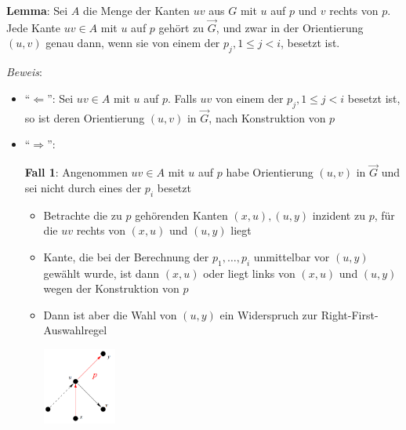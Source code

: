 \textbf{Lemma}: Sei $A$ die Menge der Kanten $uv$ aus $G$ mit $u$ auf $p$ und $v$ rechts von $p$.
Jede Kante $uv\in A$ mit $u$ auf $p$ gehört zu $\overrightarrow{G}$, und zwar in der Orientierung $(u,v)$
genau dann, wenn sie von einem der $p_j, 1\leq j<i$, besetzt ist.

\textit{Beweis}: 
\begin{itemize}
	\item \enquote{$\Leftarrow$}: Sei $uv\in A$ mit $u$ auf $p$. Falls $uv$ von einem der $p_j, 1\leq j<i$ besetzt ist, so ist deren Orientierung $(u,v)$ in $\overrightarrow{G}$, nach Konstruktion von $p$
	\item \enquote{$\Rightarrow$}: 
	
	\textbf{Fall 1}: Angenommen $uv\in A$ mit $u$ auf $p$ habe Orientierung $(u,v)$ in $\overrightarrow{G}$ und sei nicht durch eines der $p_i$ besetzt
	\begin{itemize}
		\item Betrachte die zu $p$ gehörenden Kanten $(x, u), (u, y)$ inzident zu $p$, für die $uv$ rechts von $(x, u)$ und $(u, y)$ liegt
		\item Kante, die bei der Berechnung der $p_1,\ldots,p_i$ unmittelbar vor $(u, y)$ gewählt wurde, ist dann $(x, u)$ oder liegt links von $(x, u)$ und $(u, y)$ wegen der Konstruktion von $p$
		\item Dann ist aber die Wahl von $(u, y)$ ein Widerspruch zur Right-First-Auswahlregel
		\begin{center}
			\includegraphics[width=0.2\textwidth]{images/s7.png}
		\end{center}
	\end{itemize}


\end{itemize}
